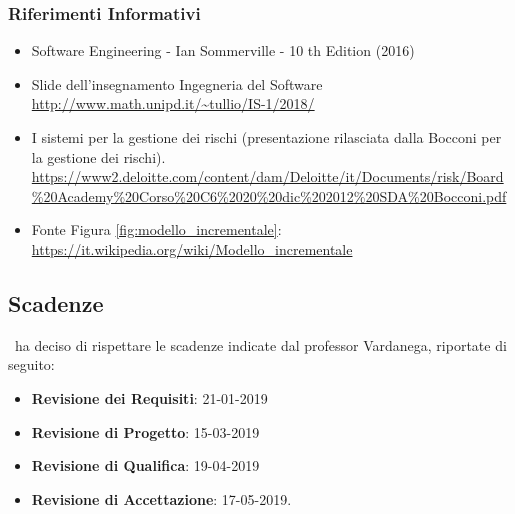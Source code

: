 		\subsubsection{Riferimenti Informativi}\label{rifinfo}
			\begin{itemize}
				\item Software Engineering - Ian Sommerville - 10 th Edition (2016)
				\item Slide dell’insegnamento Ingegneria del Software\\
				\url{http://www.math.unipd.it/~tullio/IS-1/2018/}
				\item I sistemi per la gestione dei rischi (presentazione rilasciata dalla Bocconi per la gestione dei rischi).\\
				\url{https://www2.deloitte.com/content/dam/Deloitte/it/Documents/risk/Board\%20Academy\%20Corso\%20C6\%2020\%20dic\%202012\%20SDA\%20Bocconi.pdf}
				\item Fonte Figura \ref{fig:modello_incrementale}:\\
				\url{https://it.wikipedia.org/wiki/Modello_incrementale}
			\end{itemize}
		
	\subsection{Scadenze}\label{Scadenze}
	\gruppo\ ha deciso di rispettare le scadenze indicate dal professor Vardanega, riportate di seguito:
	\begin{itemize}
		\item \textbf{Revisione dei Requisiti}: 21-01-2019
		\item \textbf{Revisione di Progetto}: 15-03-2019
		\item \textbf{Revisione di Qualifica}: 19-04-2019
		\item \textbf{Revisione di Accettazione}: 17-05-2019.
	\end{itemize}
	
